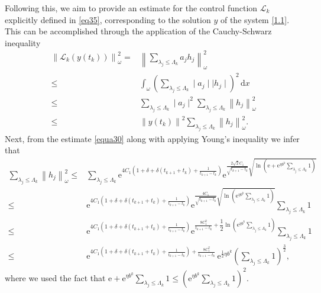 \documentclass[sn-mathphys]{sn-jnl}
\begin{document}
Following this, we aim to provide an estimate for the control function $\mathcal{L}_{k}$ explicitly defined in \eqref{eq35}, corresponding to the solution $y$ of the system \eqref{1.1}. This can be accomplished through the application of the Cauchy-Schwarz inequality
\begin{equation}\label{eqq2}
\begin{aligned}
\left\|\mathcal{L}_{k}\left(y\left(t_{k}\right)\right)\right\|_{\omega}^{2} 
=&\left\| \sum_{\lambda_{j}\leq \Lambda_{k}}  a_{j} h_{j}\right\|_{\omega}^{2}\\
\leq &\int_{\omega}\left(\sum_{\lambda_{j} \leq \Lambda_{k}}\mid a_{j}\mid \mid h_{j} \mid\right)^{2} \,\mathrm{d}x\\
\leq &\sum_{\lambda_{j} \leq \Lambda_{k}}\mid a_{j}\mid^{2} \sum_{\lambda_{j} \leq \Lambda_{k}}\left\|h_{j}\right\|_{\omega}^{2}\\
\leq &\left\|y\left(t_{k}\right)\right\|^{2} \sum_{\lambda_{j} \leq \Lambda_{k}}\left\|h_{j}\right\|_{\omega}^{2}.
\end{aligned}
\end{equation}
Next, from the estimate \eqref{equa30} along with applying Young's inequality we infer that
\begin{align*}
    \sum_{\lambda_{j} \leq \Lambda_{k}} \left\|h_{j}\right\|_{\omega}^{2}
    \leq &\sum_{\lambda_{j} \leq \Lambda_{k}} \mathrm{e}^{4 C_1 \left(1+ \delta+\delta(t_{k+1} + t_k)+ \frac{1}{t_{k+1}-t_{k}}\right)}\mathrm{e}^{\frac{2 \sqrt{2} C_1}{\sqrt{t_{k+1}-t_{k}}}\sqrt{\ln \left( \mathrm{e}+\mathrm{e}^{\eta b^{k}}\sum\limits_{\lambda_{j}\leq \Lambda_{k}}1 \right)}}\\
    \leq &\mathrm{e}^{4 C_1 \left(1+ \delta+ \delta(t_{k+1} + t_k) + \frac{1}{t_{k+1}-t_{k}}\right)}\mathrm{e}^{\frac{4 C_1}{\sqrt{t_{k+1}-t_{k}}}\sqrt{\ln \left(\mathrm{e}^{\eta b^{k}}\sum\limits_{\lambda_{j}\leq \Lambda_{k}}1 \right)}} \sum_{\lambda_{j} \leq \Lambda_{k}} 1 \\
    \leq &\mathrm{e}^{4 C_1\left(1+ \delta+ \delta(t_{k+1} + t_k) + \frac{1}{t_{k+1}-t_{k}}\right)}\mathrm{e}^{\frac{8 C_1^2}{t_{k+1}-t_{k}}+ \dfrac{1}{2}\ln \left(\mathrm{e}^{\eta b^{k}}\sum\limits_{\lambda_{j}\leq \Lambda_{k}}1\right)} \sum_{\lambda_{j} \leq \Lambda_{k}} 1 \\
    \leq &\mathrm{e}^{4 C_1\left(1+ \delta+\delta(t_{k+1} + t_k) + \frac{1}{t_{k+1}-t_{k}}\right)+\frac{8 C_1^2}{t_{k+1}-t_{k}}} \,\mathrm{e}^{\frac{1}{2}\eta b^k} \left(\sum_{\lambda_{j} \leq \Lambda_{k}} 1\right)^{\frac{3}{2}},
\end{align*}
where we used the fact that $\displaystyle{\mathrm{e}+\mathrm{e}^{\eta b^k}\sum_{\lambda_{j} \leq \Lambda_{k}} 1\leq \left( \mathrm{e}^{\eta b^k}\sum_{\lambda_{j} \leq \Lambda_{k}}1 \right)^2}$.
\end{document}
